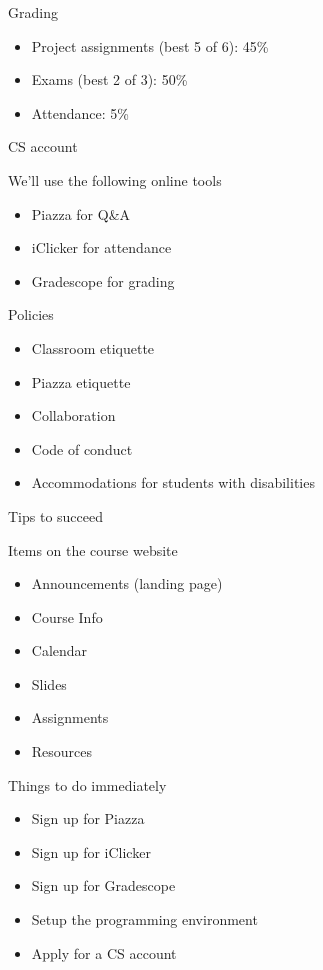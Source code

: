 \documentclass[8pt,a4paper,compress]{beamer}
\begin{document}
\begin{frame}[fragile]
\pause

Grading
\begin{itemize}
\item Project assignments (best 5 of 6): 45\%
\item Exams (best 2 of 3): 50\%
\item Attendance: 5\%
\end{itemize}

\pause
\bigskip

CS account

\pause
\bigskip

We'll use the following online tools
\begin{itemize}
\item Piazza for Q\&A
\item iClicker for attendance
\item Gradescope for grading
\end{itemize}

\pause
\bigskip

Policies
\begin{itemize}
\item Classroom etiquette
\item Piazza etiquette
\item Collaboration
\item Code of conduct
\item Accommodations for students with disabilities
\end{itemize}

\pause
\bigskip

Tips to succeed
\end{frame}

\begin{frame}[fragile]
\pause

Items on the course website
\begin{itemize}
\item Announcements (landing page)
\item Course Info
\item Calendar
\item Slides 
\item Assignments
\item Resources
\end{itemize}

\pause
\bigskip

Things to do immediately
\begin{itemize}
\item Sign up for Piazza
\item Sign up for iClicker
\item Sign up for Gradescope
\item Setup the programming environment
\item Apply for a CS account
\end{itemize}
\end{frame}
\end{document}
